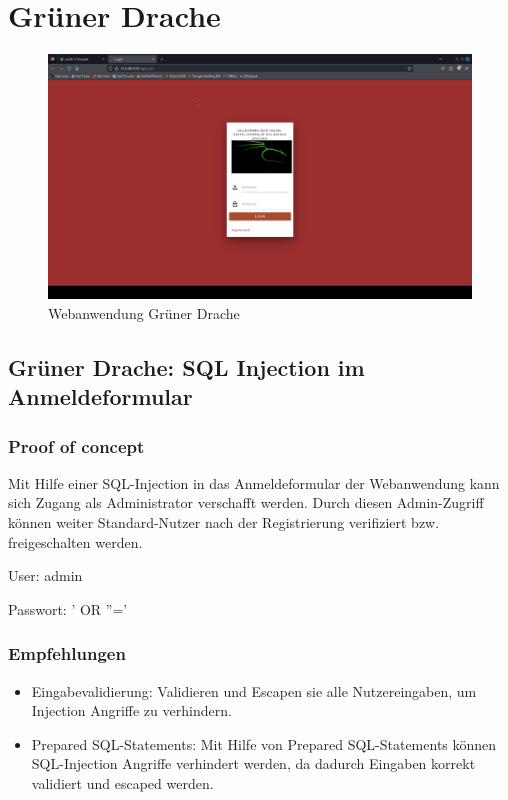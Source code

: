 \chapter{Grüner Drache}

\begin{figure}[!ht]
    \centering
    \includegraphics[width=\linewidth]{images/screenshots/04_gruener_drache.png}
    \caption{Webanwendung Grüner Drache}
    \label{fig:02_gruener_drache}
\end{figure}
\newpage


\section{\makecvssbadge Grüner Drache: SQL Injection im Anmeldeformular}

\subsection*{Proof of concept}

Mit Hilfe einer SQL-Injection in das Anmeldeformular der Webanwendung kann sich Zugang als Administrator verschafft werden. Durch diesen Admin-Zugriff können weiter Standard-Nutzer nach der Registrierung verifiziert bzw. freigeschalten werden. 

User: admin

Passwort: ' OR ''='

\subsection*{Empfehlungen} 
\begin{itemize}
    \item Eingabevalidierung: Validieren und Escapen sie alle Nutzereingaben, um Injection Angriffe zu verhindern.
    \item Prepared SQL-Statements: Mit Hilfe von Prepared SQL-Statements können SQL-Injection Angriffe verhindert werden, da dadurch Eingaben korrekt validiert und escaped werden.
\end{itemize}

